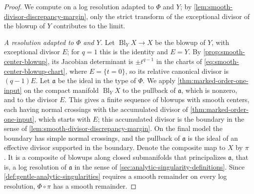 \begin{proof}
We compute on a log resolution adapted to $\Phi$ and $Y$; by \cref{lem:smooth-divisor-discrepancy-margin}, only the strict transform of the exceptional divisor of the blowup of $Y$ contributes to the limit.

\emph{A resolution adapted to $\Phi$ and $Y$.} Let $\operatorname{Bl}_YX\to X$ be the blowup of $Y$, with exceptional divisor $E$; for $q=1$ this is the identity and $E=Y$. By \cref{prop:smooth-center-blowup}, its Jacobian determinant is $\pm t^{q-1}$ in the charts of \eqref{eq:smooth-center-blowup-chart}, where $E=\{t=0\}$, so its relative canonical divisor is $(q-1)E$. Let $\mathfrak a$ be the ideal in the type of $\Phi$. We apply \cref{thm:marked-order-one-input} on the compact manifold $\operatorname{Bl}_YX$ to the pullback of $\mathfrak a$, which is nonzero, and to the divisor $E$. This gives a finite sequence of blowups with smooth centers, each having normal crossings with the accumulated divisor of \cref{thm:marked-order-one-input}, which starts with $E$; this accumulated divisor is the boundary in the sense of \cref{lem:smooth-divisor-discrepancy-margin}. On the final model the boundary has simple normal crossings, and the pullback of $\mathfrak a$ is the ideal of an effective divisor supported in the boundary. Denote the composite map to $X$ by $\pi$. It is a composite of blowups along closed submanifolds that principalizes $\mathfrak a$, that is, a log resolution of $\mathfrak a$ in the sense of \cref{sec:analytic-singularity-definitions}. Since \cref{def:gentle-analytic-singularities} requires a smooth remainder on every log resolution, $\Phi\circ\pi$ has a smooth remainder.


\end{proof}
